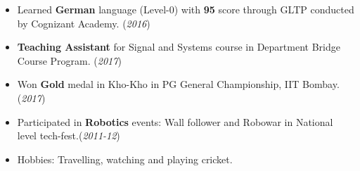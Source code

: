 \documentclass[10pt]{article}
\begin{document}
\colorbox{bl}{}
\vspace{-0.5cm}
\begin{itemize}[leftmargin=0.4cm]
    \item {Learned \textbf{German} language (Level-0) with \textbf{95} score through GLTP conducted by Cognizant Academy. }\hfill{(\textit{2016})}\vspace{-0.2cm}
    \item \textbf{Teaching Assistant} for Signal and Systems course in Department Bridge Course Program. \hfill{(\textit{2017})}\vspace{-0.2cm}
    \item {Won \textbf{Gold} medal in Kho-Kho in PG General Championship, IIT Bombay.}\hfill{(\textit{2017})}\vspace{-0.2cm}
    \item {Participated in \textbf{Robotics} events: Wall follower and Robowar in National level tech-fest.}\hfill{(\textit{2011-12})}\vspace{-0.2cm}
    \item {Hobbies: Travelling, watching and playing cricket.}

    
\end{itemize}

\end{document}

